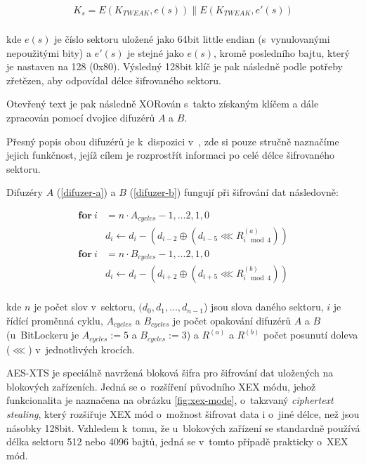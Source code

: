 \begin{align}
K_s = E(K_{TWEAK}, e(s)) \parallel E(K_{TWEAK}, e'(s)) \\ \nonumber
\end{align}

kde $e(s)$ je číslo sektoru uložené jako 64bit little endian (s~vynulovanými nepoužitými bity) a $e'(s)$ je stejné jako $e(s)$, kromě posledního bajtu, který je nastaven na 128 (0x80). Výsledný 128bit klíč je pak následně podle potřeby zřetězen, aby odpovídal délce šifrovaného sektoru.\cite{Ferguson2006,Rosendorf2013,Kumar2008}

Otevřený text je pak následně XORován s~takto získaným klíčem a dále zpracován pomocí dvojice difuzérů $A$ a $B$.

Přesný popis obou difuzérů je k~dispozici v~\cite{Ferguson2006}, zde si pouze stručně naznačíme jejich funkčnost, jejíž cílem je rozprostřít informaci po celé délce šifrovaného sektoru.

Difuzéry $A$ (\ref{difuzer-a}) a $B$ (\ref{difuzer-b}) fungují při šifrování dat následovně:

\begin{align}
\mathbf{for}\ i &= n \cdot A_{cycles} - 1,  \dots 2, 1, 0 \nonumber \\
	&d_i \leftarrow d_i - (d_{i-2} \oplus (d_{i-5} \lll R^{(a)}_{i \mod 4})) \label{difuzer-a} \\
\mathbf{for}\ i &= n \cdot B_{cycles} - 1,  \dots 2, 1, 0 \nonumber \\
	&d_i \leftarrow d_i - (d_{i+2} \oplus (d_{i+5} \lll R^{(b)}_{i \mod 4})) \label{difuzer-b} \\
\nonumber
\end{align}

kde $n$ je počet slov v~sektoru, $(d_0, d_1,\dots,d_{n-1}$) jsou slova daného sektoru, $i$ je řídící proměnná cyklu, $A_{cycles}$ a $B_{cycles}$ je počet opakování difuzérů $A$ a $B$ (u~BitLockeru je $A_{cycles} := 5$ a $B_{cycles} := 3$) a $R^{(a)}$ a $R^{(b)}$ počet posunutí doleva ($\lll$) v~jednotlivých krocích.\cite{Ferguson2006}


\label{sec:aes-xts}

AES-XTS je speciálně navržená bloková šifra pro šifrování dat uložených na blokových zařízeních. Jedná se o~rozšíření původního XEX módu, jehož funkcionalita je naznačena na obrázku \ref{fig:xex-mode}, o~takzvaný \emph{ciphertext stealing}, který rozšiřuje XEX mód o~možnost šifrovat data i o~jiné délce, než jsou násobky 128bit.\cite{Dworkin2010} Vzhledem k~tomu, že u~blokových zařízení se standardně používá délka sektoru 512 nebo 4096 bajtů, jedná se v~tomto případě prakticky o~XEX mód.

